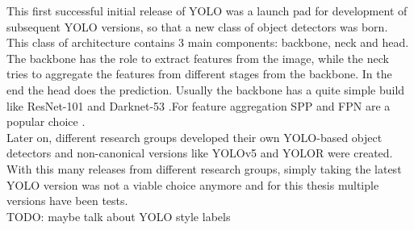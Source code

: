This first successful initial release of YOLO was a launch pad for development of subsequent YOLO versions, so that a new class of object detectors was born. This class of architecture contains 3 main components: backbone, neck and head.
The backbone has the role to extract features from the image, while the neck tries to aggregate the features from different stages from the backbone. In the end the head does the prediction. Usually the backbone has a quite simple build like ResNet-101 and Darknet-53 \cite{yolov3_paper}.For feature aggregation SPP \cite{spp_paper} and FPN \cite{fpn_paper} are a popular choice . \\
Later on, different research groups developed their own YOLO-based object detectors and non-canonical versions like YOLOv5 \cite{yolov5_git} and YOLOR \cite{yolor_paper} were created. With this many releases from different research groups, simply taking the latest YOLO version was not a viable choice anymore and for this thesis multiple versions have been tests.\\

TODO: maybe talk about YOLO style labels

